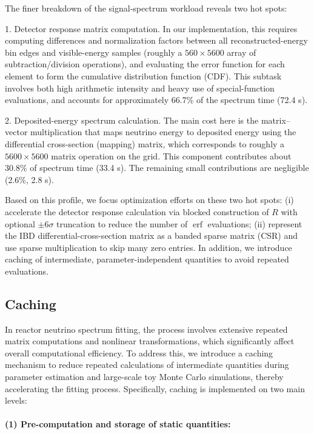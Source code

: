 \documentclass[xetex,twocolumn,epjc3]{svjour3}
\begin{document}
The finer breakdown of the signal-spectrum workload reveals two hot spots:

1. Detector response matrix computation. In our implementation, this requires computing differences and normalization factors between all reconstructed-energy bin edges and visible-energy samples (roughly a $560\times5600$ array of subtraction/division operations), and evaluating the error function for each element to form the cumulative distribution function (CDF). This subtask involves both high arithmetic intensity and heavy use of special-function evaluations, and accounts for approximately 66.7\% of the spectrum time (72.4 s).
    
2. Deposited-energy spectrum calculation. The main cost here is the matrix–vector multiplication that maps neutrino energy to deposited energy using the differential cross-section (mapping) matrix, which corresponds to roughly a $5600\times5600$ matrix operation on the grid. This component contributes about 30.8\% of spectrum time (33.4 s). The remaining small contributions are negligible (2.6\%, 2.8 s).
    

Based on this profile, we focus optimization efforts on these two hot spots: (i) accelerate the detector response calculation via blocked construction of $R$ with optional $\pm 6\sigma$ truncation to reduce the number of $\operatorname{erf}$ evaluations; (ii) represent the IBD differential-cross-section matrix as a banded sparse matrix (CSR) and use sparse multiplication to skip many zero entries. In addition, we introduce caching of intermediate, parameter-independent quantities to avoid repeated evaluations.

\subsection{Caching}
In reactor neutrino spectrum fitting, the process involves extensive repeated matrix computations and nonlinear transformations, which significantly affect overall computational efficiency. To address this, we introduce a caching mechanism to reduce repeated calculations of intermediate quantities during parameter estimation and large-scale toy Monte Carlo simulations, thereby accelerating the fitting process. Specifically, caching is implemented on two main levels:

\paragraph{(1) Pre-computation and storage of static quantities:}
\end{document}
